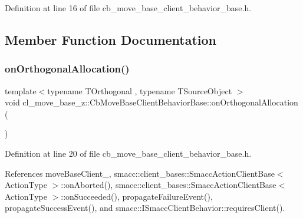 Definition at line 16 of file cb\+\_\+move\+\_\+base\+\_\+client\+\_\+behavior\+\_\+base.\+h.



\subsection{Member Function Documentation}
\mbox{\label{classcl__move__base__z_1_1CbMoveBaseClientBehaviorBase_ae9e4d5856a88c367edd755cdd00b377f}} 
\subsubsection{\texorpdfstring{on\+Orthogonal\+Allocation()}{onOrthogonalAllocation()}}
{\footnotesize\ttfamily template$<$typename T\+Orthogonal , typename T\+Source\+Object $>$ \\
void cl\+\_\+move\+\_\+base\+\_\+z\+::\+Cb\+Move\+Base\+Client\+Behavior\+Base\+::on\+Orthogonal\+Allocation (\begin{DoxyParamCaption}{ }\end{DoxyParamCaption})\hspace{0.3cm}{\ttfamily [inline]}}



Definition at line 20 of file cb\+\_\+move\+\_\+base\+\_\+client\+\_\+behavior\+\_\+base.\+h.



References move\+Base\+Client\+\_\+, smacc\+::client\+\_\+bases\+::\+Smacc\+Action\+Client\+Base$<$ Action\+Type $>$\+::on\+Aborted(), smacc\+::client\+\_\+bases\+::\+Smacc\+Action\+Client\+Base$<$ Action\+Type $>$\+::on\+Succeeded(), propagate\+Failure\+Event(), propagate\+Success\+Event(), and smacc\+::\+I\+Smacc\+Client\+Behavior\+::requires\+Client().


